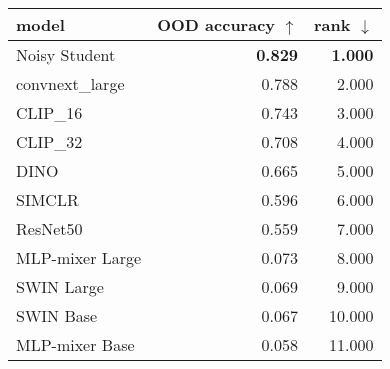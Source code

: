\begin{tabular}{lrr}
\toprule
          model & OOD accuracy $\uparrow$ & rank $\downarrow$ \\
\midrule
  Noisy Student &          \textbf{0.829} &    \textbf{1.000} \\
convnext\_large &                   0.788 &             2.000 \\
       CLIP\_16 &                   0.743 &             3.000 \\
       CLIP\_32 &                   0.708 &             4.000 \\
           DINO &                   0.665 &             5.000 \\
         SIMCLR &                   0.596 &             6.000 \\
       ResNet50 &                   0.559 &             7.000 \\
MLP-mixer Large &                   0.073 &             8.000 \\
     SWIN Large &                   0.069 &             9.000 \\
      SWIN Base &                   0.067 &            10.000 \\
 MLP-mixer Base &                   0.058 &            11.000 \\
\bottomrule
\end{tabular}

